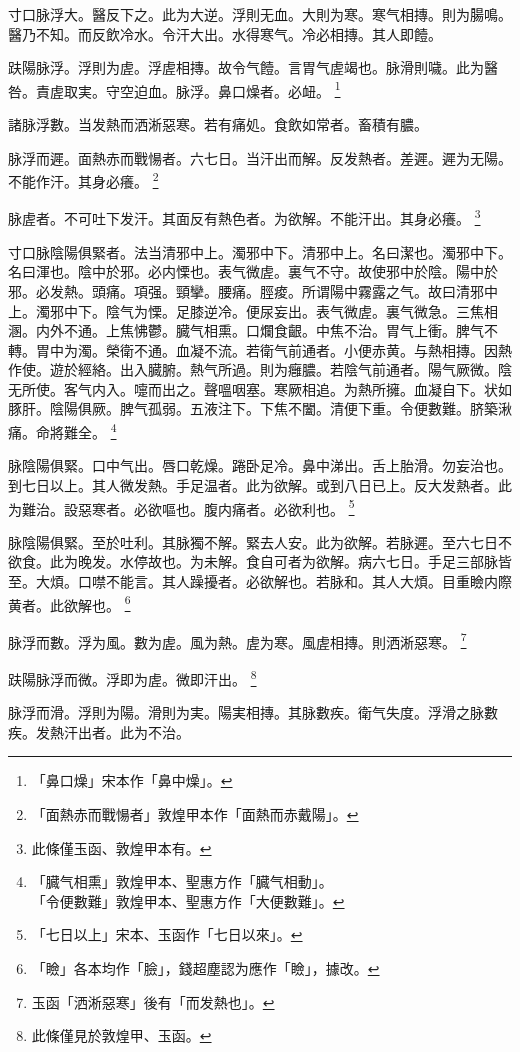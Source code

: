 寸口脉浮大。醫反下之。此为大逆。浮則无血。大則为寒。寒气相摶。則为腸鳴。醫乃不知。而反飲冷水。令汗大出。水得寒气。冷必相摶。其人即饐。

趺陽脉浮。浮則为虗。浮虗相摶。故令气饐。言胃气虗竭也。脉滑則噦。此为醫咎。責虗取実。守空迫血。脉浮。鼻口燥者。必衄。
	\footnote{「鼻口燥」宋本作「鼻中燥」。}

諸脉浮數。当发熱而洒淅惡寒。若有痛処。食飲如常者。畜積有膿。

脉浮而遲。面熱赤而戰愓者。六七日。当汗出而解。反发熱者。差遲。遲为无陽。不能作汗。其身必癢。
	\footnote{「面熱赤而戰愓者」敦煌甲本作「面熱而赤戴陽」。}

脉虗者。不可吐下发汗。其面反有熱色者。为欲解。不能汗出。其身必癢。
	\footnote{此條僅玉函、敦煌甲本有。}

寸口脉陰陽俱緊者。法当清邪中上。濁邪中下。清邪中上。名曰潔也。濁邪中下。名曰渾也。陰中於邪。必内慄也。表气微虗。裏气不守。故使邪中於陰。陽中於邪。必发熱。頭痛。項强。頸攣。腰痛。脛痠。所谓陽中霧露之气。故曰清邪中上。濁邪中下。陰气为慄。足膝逆冷。便尿妄出。表气微虗。裏气微急。三焦相溷。内外不通。上焦怫鬱。臓气相熏。口爛食齦。中焦不治。胃气上衝。脾气不轉。胃中为濁。榮衛不通。血凝不流。若衛气前通者。小便赤黄。与熱相摶。因熱作使。遊於經絡。出入臓腑。熱气所過。則为癰膿。若陰气前通者。陽气厥微。陰无所使。客气内入。嚏而出之。聲嗢咽塞。寒厥相追。为熱所擁。血凝自下。状如豚肝。陰陽俱厥。脾气孤弱。五液注下。下焦不闔。清便下重。令便數難。脐築湫痛。命將難全。
	\footnote{「臓气相熏」敦煌甲本、聖惠方作「臓气相動」。\\「令便數難」敦煌甲本、聖惠方作「大便數難」。}

脉陰陽俱緊。口中气出。唇口乾燥。踡卧足冷。鼻中涕出。舌上胎滑。勿妄治也。到七日以上。其人微发熱。手足温者。此为欲解。或到八日已上。反大发熱者。此为難治。設惡寒者。必欲嘔也。腹内痛者。必欲利也。
	\footnote{「七日以上」宋本、玉函作「七日以來」。}

脉陰陽俱緊。至於吐利。其脉獨不解。緊去人安。此为欲解。若脉遲。至六七日不欲食。此为晚发。水停故也。为未解。食自可者为欲解。病六七日。手足三部脉皆至。大煩。口噤不能言。其人躁擾者。必欲解也。若脉和。其人大煩。目重瞼内際黄者。此欲解也。
	\footnote{「瞼」各本均作「臉」，錢超塵認为應作「瞼」，據改。}

脉浮而數。浮为風。數为虗。風为熱。虗为寒。風虗相摶。則洒淅惡寒。
	\footnote{玉函「洒淅惡寒」後有「而发熱也」。}

趺陽脉浮而微。浮即为虗。微即汗出。
	\footnote{此條僅見於敦煌甲、玉函。}

脉浮而滑。浮{\khaaitp 則}为陽。滑{\khaaitp 則}为実。陽実相摶。其脉數疾。衛气失度。浮滑之脉數疾。发熱汗出者。此为不治。

